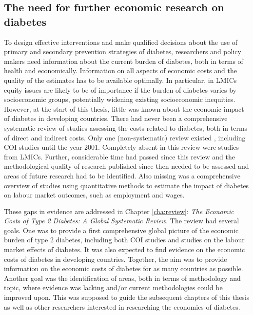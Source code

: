 \subsection{The need for further economic research on diabetes}

To design effective interventions and make qualified decisions about the use of primary and secondary prevention strategies of diabetes, researchers and policy makers need information about the current burden of diabetes, both in terms of health and economically. Information on all aspects of economic costs and the quality of the estimates has to be available optimally. In particular, in \acp{LMIC} equity issues are likely to be of importance if the burden of diabetes varies by socioeconomic groups, potentially widening existing socioeconomic inequities. However, at the start of this thesis, little was known about the economic impact of diabetes in developing countries. There had never been a comprehensive systematic review of studies assessing the costs related to diabetes, both in terms of direct and indirect costs. Only one (non-systematic) review existed \parencite{Ettaro2004}, including \ac{COI} studies  until the year 2001. Completely absent in this review were studies from \acp{LMIC}. Further, considerable time had passed since this review and the methodological quality of research published since then needed to be assessed and areas of future research had to be identified. Also missing was a comprehensive overview of studies using quantitative methods to estimate the impact of diabetes on labour market outcomes, such as employment and wages.

These gaps in evidence are addressed in Chapter \ref{cha:review}: \textit{The Economic Costs of Type 2 Diabetes: A Global Systematic Review}. The review had several goals. One was to provide a first comprehensive global picture of the economic burden of type 2 diabetes, including both \ac{COI} studies and studies on the labour market effects of diabetes. It was also expected to find evidence on the economic costs of diabetes in developing countries. Together, the aim was to provide information on the economic costs of diabetes for as many countries as possible. Another goal was the identification of areas, both in terms of methodology and topic, where evidence was lacking and/or current methodologies could be improved upon. This was supposed to guide the subsequent chapters of this thesis as well as other researchers interested in researching the economics of diabetes.


